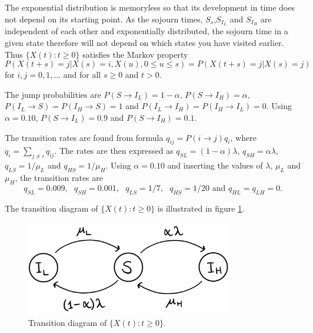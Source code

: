 
The exponential distribution is memoryless so that its development in time does not depend on its starting point. As the sojourn times, $S_s$,$S_{I_L}$ and $S_{I_H}$ are independent of each other and exponentially distributed, the sojourn time in a given state therefore will not depend on which states you have visited earlier. Thus $\{X(t):t \geq 0 \}$  satisfies the Markov property
$$P(X(t+s)=j|X(s)=i, X(u), 0 \leq u \leq s)=P(X(t+s)=j|X(s)=j)$$ 
for $i,j = 0,1,...$ and for all $s \geq 0$ and $t >0 $.

The jump probabilities are $P(S \rightarrow I_L)= 1 - \alpha$, $P(S \rightarrow I_H)= \alpha$, $P(I_L \rightarrow S)= P(I_H \rightarrow S) = 1$ and $P(I_L \rightarrow I_H)= P(I_H \rightarrow I_L) = 0$. Using $\alpha = 0.10$, $P(S \rightarrow I_L)= 0.9$ and $P(S \rightarrow I_H)= 0.1$. 

The transition rates are found from formula $q_{ij} = P(i \rightarrow j ) q_i$, where $q_i = \sum_{j \neq i} q_{ij}$. The rates are then expressed as $q_{SL} = (1-\alpha)\lambda $, $q_{SH} = \alpha \lambda$, $q_{LS} = 1/\mu_L$ and $q_{HS} = 1/\mu_H$. Using $\alpha = 0.10$ and inserting the values of $\lambda$, $\mu_L$ and $\mu_H$, the transition rates are 
$$q_{SL} = 0.009,\text{ } q_{SH} = 0.001, \text{ } q_{LS} = 1/7, \text{ } q_{HS} = 1/20 \text{ and } q_{HL}=q_{LH}=0.$$

The transition diagram of $\{X(t):t \geq 0 \}$ is illustrated in figure \ref{transdiagramA}. 

\begin{figure}
    \centering
    \includegraphics[width=90mm]{TransDiag1A.png}
    \caption{Transition diagram of $\{X(t):t\geq0\}$.}
    \label{transdiagramA}
\end{figure}




